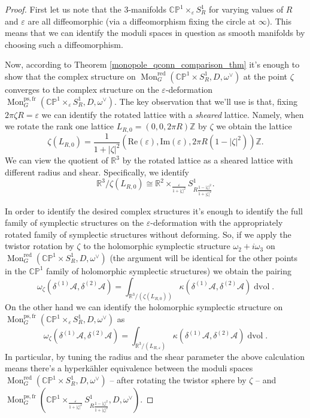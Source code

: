 \documentclass[11pt, oneside, reqno]{amsart}
\theoremstyle{definition} \newtheorem{definition}{Definition}[section]
\theoremstyle{definition} \newtheorem{remark}[definition]{Remark}
\theoremstyle{definition} \newtheorem{remarks}[definition]{Remarks}
\theoremstyle{definition} \newtheorem{question}[definition]{Question}
\theoremstyle{definition} \newtheorem*{note}{Note}
\theoremstyle{definition} \newtheorem{example}[definition]{Example}
\theoremstyle{definition} \newtheorem{examples}[definition]{Examples}
\newcommand{\bb}[1]{\mathbb{#1}}
\newcommand{\mr}[1]{\mathrm{#1}}
\newcommand{\mc}[1]{\mathcal{#1}}
\newcommand{\RR}{\mathbb{R}}
\newcommand{\ZZ}{\mathbb{Z}}
\newcommand{\eps}{\varepsilon}
\newcommand{\iso}{\cong}
\DeclareMathOperator{\dvol}{dvol}
\DeclareMathOperator{\mon}{Mon}
\newcommand{\fr}{\mathrm{fr}}
\begin{document}
\begin{proof}
First let us note that the 3-manifolds $\bb{CP}^1 \times_\eps S^1_R$ for varying values of $R$ and $\eps$ are all diffeomorphic (via a diffeomorphism fixing the circle at $\infty$).  This means that we can identify the moduli spaces in question as smooth manifolds by choosing such a diffeomorphism.  

Now, according to Theorem \ref{monopole_qconn_comparison_thm} it's enough to show that the complex structure on $\mon_G^{\text{red}}(\bb{CP}^1 \times S^1_R,D,\omega^\vee)$ at the point $\zeta$ converges to the complex structure on the $\eps$-deformation $\mon_G^{\mr{ps},\fr}(\bb{CP}^1 \times_\eps S^1_R,D,\omega^\vee)$.  The key observation that we'll use is that, fixing $2 \pi \zeta R = \eps$ we can identify the rotated lattice with a \emph{sheared} lattice.  Namely, when we rotate the rank one lattice $L_{R,0} = (0,0,2\pi R)\ZZ$ by $\zeta$ we obtain the lattice
\[\zeta(L_{R,0}) = \frac {1}{1+|\zeta|^2} (\mr{Re}(\eps), \mr{Im}(\eps), 2\pi R (1-|\zeta|^2) )\ZZ.\]
We can view the quotient of $\RR^3$ by the rotated lattice as a sheared lattice with different radius and shear.  Specifically, we identify
\[\RR^3 / \zeta(L_{R,0}) \iso \RR^2 \times_{\frac{\eps}{1+|\zeta|^2}} S^1_{R \frac {1-|\zeta|^2}{1+|\zeta|^2}}.\]

In order to identify the desired complex structures it's enough to identify the full family of symplectic structures on the $\eps$-deformation with the appropriately rotated family of symplectic structures without deforming.  So, if we apply the twistor rotation by $\zeta$ to the holomorphic symplectic structure $\omega_2 + i\omega_3$ on $\mon_G^{\text{red}}(\bb{CP}^1 \times S^1_R,D,\omega^\vee)$ (the argument will be identical for the other points in the $\bb{CP}^1$ family of holomorphic symplectic structures) we obtain the pairing
\[\omega_\zeta(\delta^{(1)}\mc A, \delta^{(2)}\mc A) = \int_{\RR^3/(\zeta(L_{R,0}))} \kappa(\delta^{(1)} \mc A, \delta^{(2)} \mc A) \dvol.\]
On the other hand we can identify the holomorphic symplectic structure on $\mon_G^{\mr{ps},\fr}(\bb{CP}^1 \times_\eps S^1_R,D,\omega^\vee)$ as
\[\omega_\zeta(\delta^{(1)}\mc A, \delta^{(2)}\mc A) = \int_{\RR^3/(L_{R,\eps})} \kappa(\delta^{(1)} \mc A, \delta^{(2)} \mc A) \dvol.\]
In particular, by tuning the radius and the shear parameter the above calculation means there's a hyperk\"ahler equivalence between the moduli spaces $\mon_G^{\text{red}}(\bb{CP}^1 \times S^1_R,D,\omega^\vee)$ -- after rotating the twistor sphere by $\zeta$ -- and $\mon_G^{\mr{ps},\fr}(\bb{CP}^1 \times_{\frac{\eps}{1+|\zeta|^2}} S^1_{R \frac {1-|\zeta|^2}{1+|\zeta|^2}},D,\omega^\vee)$.  


\end{proof}
\end{document}
